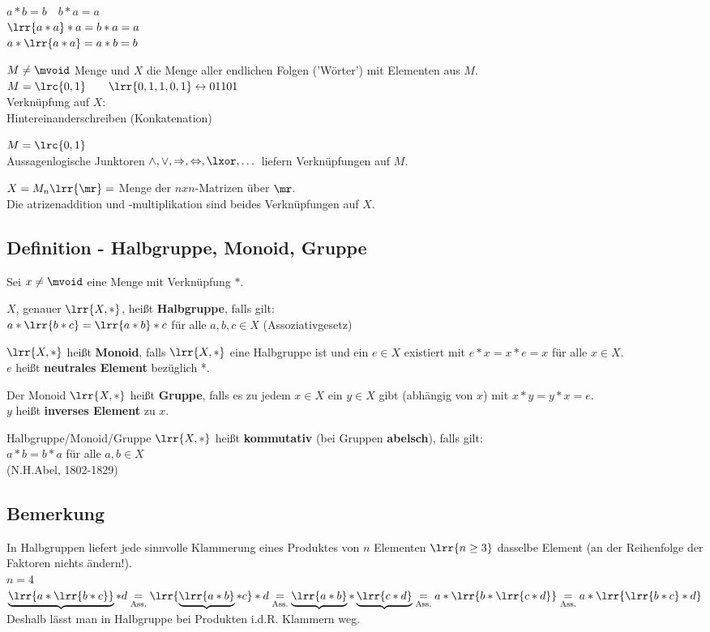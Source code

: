 			$a*b=b\quad b*a=a$\\
			$\lrr{a*a}*a=b*a=a$\\
			$a*\lrr{a*a}=a*b=b$
		\item $M\neq\mvoid$ Menge und $X$ die Menge aller endlichen Folgen ('Wörter') mit Elementen aus $M$.\\
			$M=\lrc{0,1}\qquad\lrr{0,1,1,0,1}\leftrightarrow 01101$\\
			Verknüpfung auf $X$:\\
			Hintereinanderschreiben (Konkatenation)
		\item $M=\lrc{0,1}$\\
			Aussagenlogische Junktoren $\land,\lor,\Rightarrow,\Leftrightarrow,\lxor,\dots$ liefern Verknüpfungen auf $M$.
		\item $X=M_n\lrr{\mr}=$ Menge der $nxn$-Matrizen über $\mr$.\\
			Die atrizenaddition und -multiplikation sind beides Verknüpfungen auf $X$.
	\subExEnd
\subsection{Definition - Halbgruppe, Monoid, Gruppe}
	Sei $x\neq\mvoid$ eine Menge mit Verknüpfung $*$.
		\item $X$, genauer $\lrr{X,*}$, heißt \textbf{Halbgruppe}, falls gilt: \\
			$a*\lrr{b*c}=\lrr{a*b}*c$ für alle $a,b,c\in X$ (Assoziativgesetz)
		\item $\lrr{X,*}$ heißt \textbf{Monoid}, falls $\lrr{X,*}$ eine Halbgruppe ist und ein $e\in X$ existiert mit $e*x=x*e=x$ für alle $x\in X$. \\
			$e$ heißt \textbf{neutrales Element} bezüglich *.
		\item Der Monoid $\lrr{X,*}$ heißt \textbf{Gruppe}, falls es zu jedem $x\in X$ ein $y\in X$ gibt (abhängig von $x$) mit $x*y=y*x = e$.\\
			$y$ heißt \textbf{inverses Element} zu $x$.
		\item Halbgruppe/Monoid/Gruppe $\lrr{X,*}$ heißt \textbf{kommutativ} (bei Gruppen \textbf{abelsch}), falls gilt:\\
			$a*b=b*a$ für alle $a,b\in X$ \\
			(N.H.Abel, 1802-1829)
	\subExEnd
\subsection{Bemerkung}
	In Halbgruppen liefert jede sinnvolle Klammerung eines Produktes von $n$ Elementen $\lrr{n\geq 3}$ dasselbe Element (an der Reihenfolge der Faktoren nichts ändern!).\\
	$n=4$\\
	$\underbrace{\lrr{a*\lrr{b*c}}}*d\underset{\mbox{\scriptsize Ass.}}{=}\lrr{\underbrace{\lrr{a*b}}*c}*d\underset{\mbox{\scriptsize Ass.}}{=}\underbrace{\lrr{a*b}}*\underbrace{\lrr{c*d}}\underset{\mbox{\scriptsize Ass.}}{=}a*\lrr{b*\lrr{c*d}}\underset{\mbox{\scriptsize Ass.}}{=}a*\lrr{\lrr{b*c}*d}$\\
	Deshalb lässt man in Halbgruppe bei Produkten i.d.R. Klammern weg.